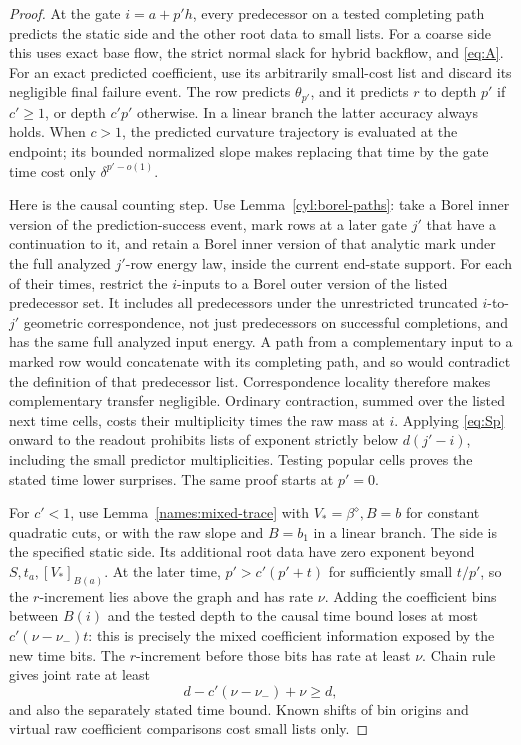 \begin{proof}
At the gate \(i=a+p'h\), every predecessor on a tested completing
path predicts the static side and the other root data to small
lists. For a coarse side this uses exact base flow, the strict
normal slack for hybrid backflow, and \eqref{eq:A}. For an
exact predicted coefficient, use its arbitrarily small-cost list
and discard its negligible final failure event. The row predicts
\(\theta_{p'}\), and it predicts \(r\) to depth \(p'\) if
\(c'\geq1\), or depth \(c'p'\) otherwise. In a linear branch
the latter accuracy always holds. When \(c>1\), the predicted
curvature trajectory is evaluated at the endpoint; its bounded
normalized slope makes replacing that time by the gate time
cost only \(\delta^{p'-o(1)}\).

Here is the causal counting step. Use Lemma~\ref{cyl:borel-paths}:
take a Borel inner version of the prediction-success event, mark
rows at a later gate \(j'\) that have a continuation to it, and
retain a Borel inner version of that analytic mark under the full
analyzed \(j'\)-row energy law, inside the current end-state support.
For each of their times, restrict
the \(i\)-inputs to
a Borel outer version of the listed predecessor set. It includes all
predecessors under the unrestricted truncated \(i\)-to-\(j'\)
geometric correspondence, not just predecessors on successful
completions, and has the same full analyzed input energy. A path from a
complementary input to a marked row would
concatenate with its completing path, and
so would contradict the definition of that predecessor list.
Correspondence locality therefore makes complementary transfer
negligible. Ordinary contraction, summed over the listed next
time cells, costs their multiplicity times the raw mass at
\(i\). Applying \eqref{eq:Sp} onward to the readout prohibits
lists of exponent strictly below \(d(j'-i)\), including the
small predictor multiplicities. Testing popular cells proves
the stated time lower surprises. The same proof starts at
\(p'=0\).

For \(c'<1\), use Lemma~\ref{names:mixed-trace} with
\(V_*=\beta^\diamond,B=b\) for constant quadratic cuts, or
with the raw slope and \(B=b_1\) in a linear branch. The side
is the specified static side. Its additional root data have
zero exponent beyond \(S,t_a,[V_*]_{B(a)}\). At the later
time, \(p'>c'(p'+t)\) for sufficiently small \(t/p'\), so
the \(r\)-increment lies above the graph and has rate \(\nu\).
Adding the coefficient bins between \(B(i)\) and the tested
depth to the causal time bound loses at most
\(c'(\nu-\nu_-)t\): this is precisely the mixed coefficient
information exposed by the new time bits. The \(r\)-increment
before those bits has rate at least \(\nu\). Chain rule gives
joint rate at least
\[
 d-c'(\nu-\nu_-)+\nu\geq d,
\]
and also the separately stated time bound. Known shifts of bin
origins and virtual raw coefficient comparisons cost small
lists only.
\end{proof}

